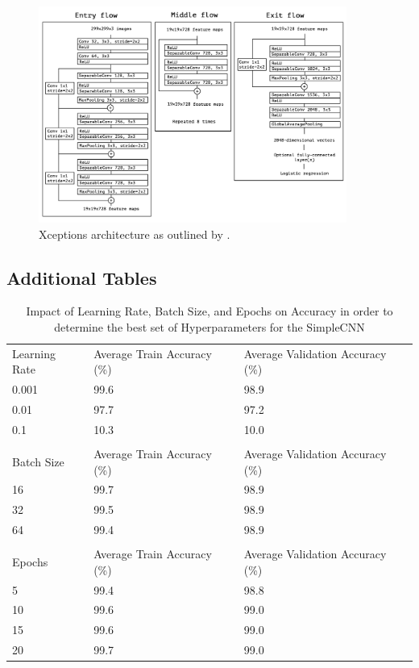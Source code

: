 \begin{figure}[ht]
    \centering
    \includegraphics[width=0.9\textwidth]{figures/xception_architecture.png}
    \caption{Xceptions architecture as outlined by \citeauthor{chollet2017xception}.}\label{fig:xceptionArchitecture}
\end{figure}

\subsection{Additional Tables}\label{Appendixtables}

\begin{table}[ht]
    \caption{Impact of Learning Rate, Batch Size, and Epochs on Accuracy in order to determine the best set of Hyperparameters for the SimpleCNN}\label{table:lr_bs_ep}
    \centering
    \begin{tabular}{lll}
    \toprule
    \addlinespace
    \multicolumn{3}{c}{Learning Rate} \\
    \midrule
    Learning Rate & Average Train Accuracy (\%) & Average Validation Accuracy (\%) \\
    \midrule
    0.001 & 99.6 & 98.9 \\
    0.01  & 97.7 & 97.2 \\
    0.1   & 10.3 & 10.0 \\
    \midrule
    \addlinespace
    \addlinespace
    \multicolumn{3}{c}{Batch Size} \\
    \midrule
    Batch Size & Average Train Accuracy (\%) & Average Validation Accuracy (\%) \\
    \midrule
    16 & 99.7 & 98.9 \\
    32 & 99.5 & 98.9 \\
    64 & 99.4 & 98.9 \\
    \midrule
    \addlinespace
    \addlinespace
    \multicolumn{3}{c}{Epochs} \\
    \midrule
    Epochs & Average Train Accuracy (\%) & Average Validation Accuracy (\%) \\
    \midrule
    5  & 99.4 & 98.8 \\
    10 & 99.6 & 99.0 \\
    15 & 99.6 & 99.0 \\
    20 & 99.7 & 99.0 \\
    \bottomrule
    \end{tabular}
    \end{table}